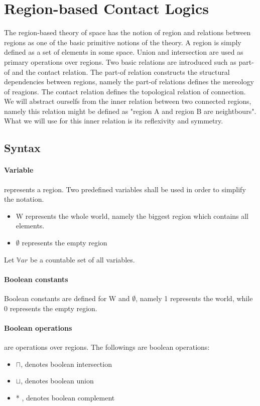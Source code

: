 \documentclass{article}
\begin{document}
	\section{Region-based Contact Logics}
The region-based theory of space has the notion of region and relations between regions as one of the basic primitive notions of the theory.
A region is simply defined as a set of elements in some space. Union and intersection are used as primary operations over regions.
Two basic relations are introduced such as part-of and the contact relation. 
The part-of relation constructs the structural dependencies between regions, namely the part-of relations defines the mereology of reagions.
The contact relation defines the topological relation of connection. We will abstract ourselfs from the inner relation between two connected regions, namely
this relation might be defined as "region A and region B are neightbours". What we will use for this inner relation is its reflexivity and symmetry.
	\subsection{Syntax}

	\paragraph{Variable} 
represents a region. Two predefined variables shall be used in order to simplify the notation. 
		\begin{itemize}
			\item W represents the whole world, namely the biggest region which contains all elements.
			\item $\emptyset$ represents the empty region
		\end{itemize}
Let $\mathbb{V}ar$ be a countable set of all variables.

	\paragraph{Boolean constants}
Boolean constants are defined for W and $\emptyset$, namely 1 represents the world, while 0 represents the empty region.

	\paragraph{Boolean operations}
are operations over regions. The followings are boolean operations:
		\begin{itemize}
			\item $\sqcap$, denotes boolean intersection
			\item $\sqcup$, denotes boolean union
			\item * , denotes boolean complement
		\end{itemize}
\end{document}
